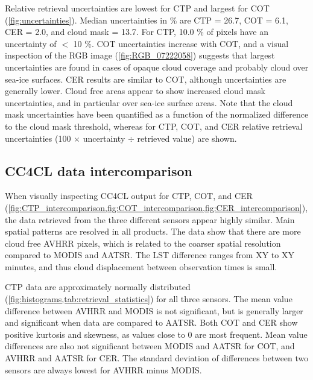 Relative retrieval uncertainties are lowest for CTP and largest for COT (\cref{fig:uncertainties}). Median uncertainties in \% are CTP = 26.7, COT = 6.1, CER = 2.0, and cloud mask = 13.7. For CTP, 10.0 \% of pixels have an uncertainty of $<$ 10 \%. COT uncertainties increase with COT, and a visual inspection of the RGB image (\cref{fig:RGB_07222058}) suggests that largest uncertainties are found in cases of opaque cloud coverage and probably cloud over sea-ice surfaces. CER results are similar to COT, although uncertainties are generally lower. Cloud free areas appear to show increased cloud mask uncertainties, and in particular over sea-ice surface areas. Note that the cloud mask uncertainties have been quantified as a function of the normalized difference to the cloud mask threshold, whereas for CTP, COT, and CER relative retrieval uncertainties (100 $\times$ uncertainty $\div$ retrieved value) are shown. 

\subsection{CC4CL data intercomparison}

When visually inspecting CC4CL output for CTP, COT, and CER (\cref{fig:CTP_intercomparison,fig:COT_intercomparison,fig:CER_intercomparison}), the data retrieved from the three different sensors appear highly similar. Main spatial patterns are resolved in all products. The data show that there are more cloud free AVHRR pixels, which is related to the coarser spatial resolution compared to MODIS and AATSR. The LST difference ranges from XY to XY minutes, and thus cloud displacement between observation times is small.

CTP data are approximately normally distributed (\cref{fig:histograms,tab:retrieval_statistics}) for all three sensors. The mean value difference between AVHRR and MODIS is not significant, but is generally larger and significant when data are compared to AATSR. Both COT and CER show positive kurtosis and skewness, as values close to 0 are most frequent. Mean value differences are also not significant between MODIS and AATSR for COT, and AVHRR and AATSR for CER. The standard deviation of differences between two sensors are always lowest for AVHRR minus MODIS.

